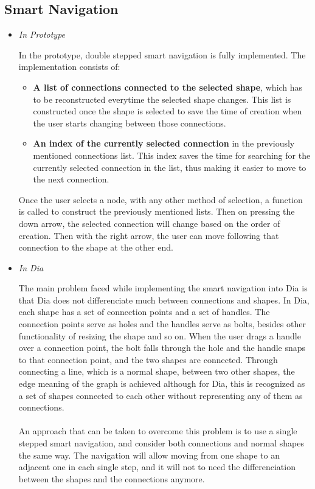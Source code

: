 \subsection{Smart Navigation}
\begin{itemize}
\item {\it In Prototype}
\par \noindent
In the prototype, double stepped smart navigation is fully implemented. 
The implementation consists of:
\begin{itemize}
\item {\bf A list of connections connected to the selected shape}, which has to be reconstructed everytime the selected shape changes. This list is constructed once the shape is selected to save the time of creation when the user starts changing between those connections.
\item {\bf An index of the currently selected connection} in the previously mentioned connections list. This index saves the time for searching for the currently selected connection in the list, thus making it easier to move to the next connection.
\end{itemize}
Once the user selects a node, with any other method of selection, a function is called to construct the previously mentioned lists. Then on pressing the down arrow, the selected connection will change based on the order of creation. Then with the right arrow, the user can move following that connection to the shape at the other end.


\item {\it In Dia}
\par \noindent
The main problem faced while implementing the smart navigation into Dia is that Dia does not differenciate much between connections and shapes. In Dia, each shape has a set of connection points and a set of handles. The connection points serve as holes and the handles serve as bolts, besides other functionality of resizing the shape and so on. When the user drags a handle over a connection point, the bolt falls through the hole and the handle snaps to that connection point, and the two shapes are connected. Through connecting a line, which is a normal shape, between two other shapes, the edge meaning of the graph is achieved although for Dia, this is recognized as a set of shapes connected to each other without representing any of them as connections.

\paragraph{}
An approach that can be taken to overcome this problem is to use a single stepped smart navigation, and consider both connections and normal shapes the same way. The navigation will allow moving from one shape to an adjacent one in each single step, and it will not to need the differenciation between the shapes and the connections anymore.


\end{itemize}
